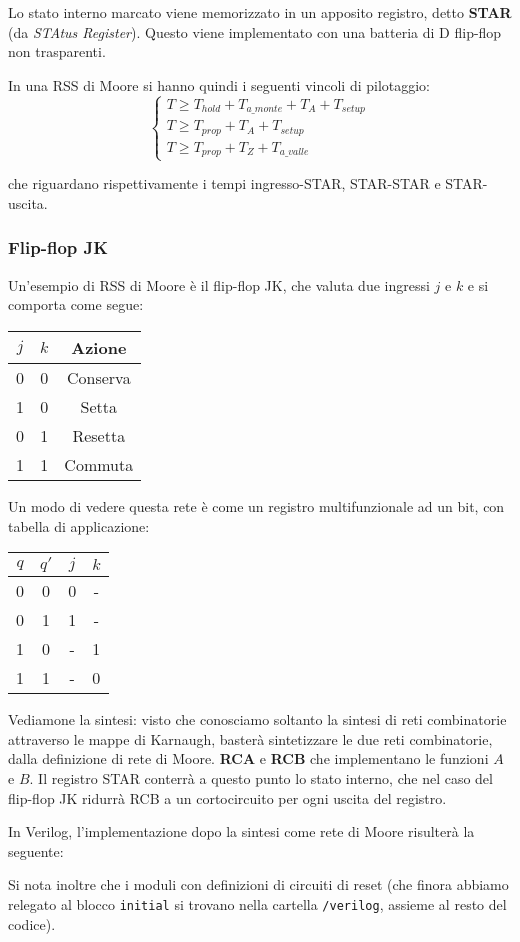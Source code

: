\documentclass[a4paper,11pt]{article}
\begin{document}
Lo stato interno marcato viene memorizzato in un apposito registro, detto \textbf{STAR} (da \textit{STAtus Register}).
Questo viene implementato con una batteria di D flip-flop non trasparenti.

In una RSS di Moore si hanno quindi i seguenti vincoli di pilotaggio:
\[
	\begin{cases}
		T \geq T_{hold} + T_{a\_monte} + T_A + T_{setup} \\ 
		T \geq T_{prop} + T_A + T_{setup} \\ 
		T \geq T_{prop} + T_Z + T_{a\_valle}
	\end{cases}
\]

che riguardano rispettivamente i tempi ingresso-STAR, STAR-STAR e STAR-uscita.

\subsubsection{Flip-flop JK}
Un'esempio di RSS di Moore è il flip-flop JK, che valuta due ingressi $j$ e $k$ e si comporta come segue:
\begin{table}[h!]
	\center {}
	\begin{tabular} { c | c | c }
		$j$ & $k$ & Azione \\ 
		\hline 
		0 & 0 & Conserva \\ 
		1 & 0 & Setta \\ 
		0 & 1 & Resetta \\ 
		1 & 1 & Commuta
	\end{tabular}
\end{table}

Un modo di vedere questa rete è come un registro multifunzionale ad un bit, con tabella di applicazione:
\begin{table}[h!]
	\center 
	\begin{tabular} { c  c | c  c }
		$q$ & $q'$ & $j$ & $k$ \\ 
		\hline 
		0 & 0 & 0 & - \\ 
		0 & 1 & 1 & - \\ 
		1 & 0 & - & 1 \\ 
		1 & 1 & - & 0
	\end{tabular}
\end{table}

Vediamone la sintesi: visto che conosciamo soltanto la sintesi di reti combinatorie attraverso le mappe di Karnaugh, basterà sintetizzare le due reti combinatorie, dalla definizione di rete di Moore. \textbf{RCA} e \textbf{RCB} che implementano le funzioni $A$ e $B$.
Il registro STAR conterrà a questo punto lo stato interno, che nel caso del flip-flop JK ridurrà RCB a un cortocircuito per ogni uscita del registro.

In Verilog, l'implementazione dopo la sintesi come rete di Moore risulterà la seguente:



Si nota inoltre che i moduli con definizioni di circuiti di reset (che finora abbiamo relegato al blocco \lstinline|initial| si trovano nella cartella \lstinline|/verilog|, assieme al resto del codice).
\end{document}
